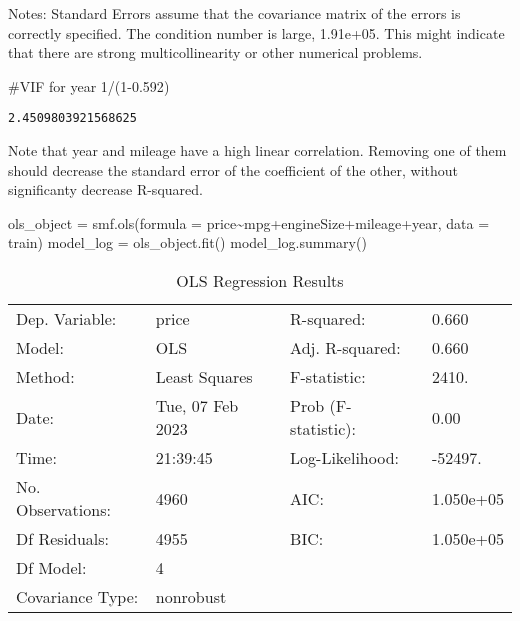 \documentclass[
  letterpaper,
  DIV=11,
  numbers=noendperiod]{scrreprt}
\newenvironment{Shaded}{\begin{snugshade}}{\end{snugshade}}
\newcommand{\CommentTok}[1]{\textcolor[rgb]{0.37,0.37,0.37}{#1}}
\newcommand{\DecValTok}[1]{\textcolor[rgb]{0.68,0.00,0.00}{#1}}
\newcommand{\FloatTok}[1]{\textcolor[rgb]{0.68,0.00,0.00}{#1}}
\newcommand{\NormalTok}[1]{\textcolor[rgb]{0.00,0.23,0.31}{#1}}
\newcommand{\OperatorTok}[1]{\textcolor[rgb]{0.37,0.37,0.37}{#1}}
\newcommand{\StringTok}[1]{\textcolor[rgb]{0.13,0.47,0.30}{#1}}
\begin{document}
Notes: \newline
 [1] Standard Errors assume that the covariance matrix of the errors is correctly specified. \newline
 [2] The condition number is large, 1.91e+05. This might indicate that there are \newline
 strong multicollinearity or other numerical problems.

\begin{Shaded}
\begin{Highlighting}[]
\CommentTok{\#VIF for year}
\DecValTok{1}\OperatorTok{/}\NormalTok{(}\DecValTok{1}\OperatorTok{{-}}\FloatTok{0.592}\NormalTok{)}
\end{Highlighting}
\end{Shaded}

\begin{verbatim}
2.4509803921568625
\end{verbatim}

Note that year and mileage have a high linear correlation. Removing one
of them should decrease the standard error of the coefficient of the
other, without significanty decrease R-squared.

\begin{Shaded}
\begin{Highlighting}[]
\NormalTok{ols\_object }\OperatorTok{=}\NormalTok{ smf.ols(formula }\OperatorTok{=} \StringTok{\textquotesingle{}price\textasciitilde{}mpg+engineSize+mileage+year\textquotesingle{}}\NormalTok{, data }\OperatorTok{=}\NormalTok{ train)}
\NormalTok{model\_log }\OperatorTok{=}\NormalTok{ ols\_object.fit()}
\NormalTok{model\_log.summary()}
\end{Highlighting}
\end{Shaded}

\begin{longtable}[]{@{}llll@{}}
\caption{OLS Regression Results}\tabularnewline
\toprule\noalign{}
\endfirsthead
\endhead
\bottomrule\noalign{}
\endlastfoot
Dep. Variable: & price & R-squared: & 0.660 \\
Model: & OLS & Adj. R-squared: & 0.660 \\
Method: & Least Squares & F-statistic: & 2410. \\
Date: & Tue, 07 Feb 2023 & Prob (F-statistic): & 0.00 \\
Time: & 21:39:45 & Log-Likelihood: & -52497. \\
No. Observations: & 4960 & AIC: & 1.050e+05 \\
Df Residuals: & 4955 & BIC: & 1.050e+05 \\
Df Model: & 4 & & \\
Covariance Type: & nonrobust & & \\
\end{longtable}
\end{document}
